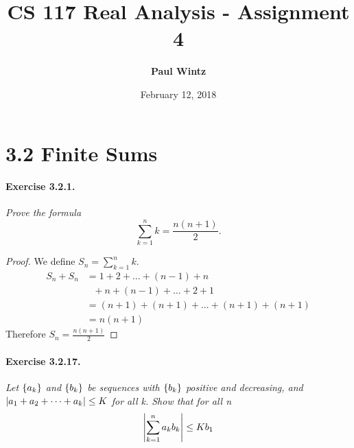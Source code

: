 \documentclass[11pt]{article}
\DeclarePairedDelimiter{\abs}{\lvert}{\rvert}
\DeclarePairedDelimiter{\braces}{\lbrace}{\rbrace}
\begin{document}
\title{CS 117 Real Analysis - Assignment 4}
\author{\textbf{Paul Wintz}}
\date{February 12, 2018}
\maketitle

\section*{3.2 Finite Sums}
\paragraph{Exercise 3.2.1.} \textit{Prove the formula}
\[ \sum_{k=1}^{n} k = \frac{n(n+1)}{2}. \]


\begin{proof}
	We define $S_n = \sum_{k=1}^{n} k$. 
	\begin{align*}
	S_n + S_n &= 1 + 2 + \dots + (n-1) + n \\
	 		  &\ \ \ + n + (n-1) + \dots + 2 + 1 \\ 
              &= (n+1) + (n+1) + ... + (n+1) + (n+1) \\
	          &= n(n+1)
	\end{align*}
	Therefore $S_n = \frac{n(n+1)}{2}$
\end{proof}

\def \Ak {A_k}
\def \AkSeries {\abs{a_1 + a_2 + \cdots + a_k}}
\def \absum {\abs*{\sum_{k=1}^{n} a_kb_k}}
\def \abstarsum {\abs*{\sum_{k=1}^{n} a^*_kb_k}}
\paragraph{Exercise 3.2.17.} \textit{Let $\braces{a_k}$ and $\braces{b_k}$ be sequences with
$\braces{b_k}$ positive and decreasing, and} $\AkSeries  \le K$ \textit{for all k. Show that for all n} \[ \absum \le Kb_1 \]
\end{document}
